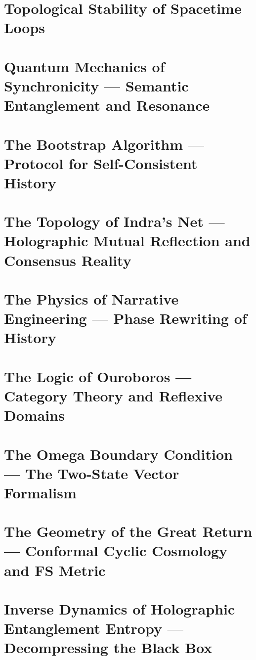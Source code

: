 \documentclass[11pt,a4paper,twoside]{book}
\begin{document}
\chapter{Topological Stability of Spacetime Loops}

\chapter{Quantum Mechanics of Synchronicity --- Semantic Entanglement and Resonance}

\chapter{The Bootstrap Algorithm --- Protocol for Self-Consistent History}

\chapter{The Topology of Indra's Net --- Holographic Mutual Reflection and Consensus Reality}

\chapter{The Physics of Narrative Engineering --- Phase Rewriting of History}

\chapter{The Logic of Ouroboros --- Category Theory and Reflexive Domains}

\chapter{The Omega Boundary Condition --- The Two-State Vector Formalism}

\chapter{The Geometry of the Great Return --- Conformal Cyclic Cosmology and FS Metric}

\chapter{Inverse Dynamics of Holographic Entanglement Entropy --- Decompressing the Black Box}

\end{document}

